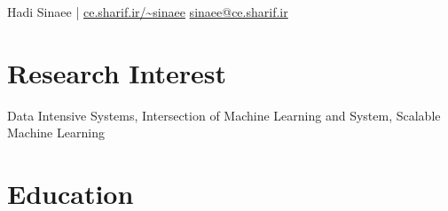 \documentclass[10pt,a4paper,roman]{moderncv}        %
\begin{document}
\def\mediumSpace{1.1em}
\def\shortSpace{.6em}

{\color{black} \Huge Hadi Sinaee |} 
\faGlobe \space \href{ce.sharif.ir/~sinaee}{ce.sharif.ir/\textasciitilde sinaee} \hfill \faEnvelope \space \href{mailto:sinaee@ce.sharif.ir?Subject=Hello Hadi!}{sinaee@ce.sharif.ir} 
\newline
\newline
\section{Research Interest}
Data Intensive Systems, Intersection of Machine Learning and System, Scalable Machine Learning



\section{Education}


\end{document}
